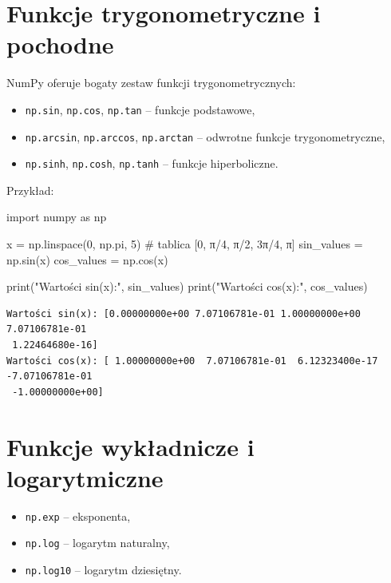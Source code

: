 \documentclass[
  polish,
  letterpaper,
  DIV=11,
  numbers=noendperiod]{scrreprt}
\newenvironment{Shaded}{\begin{snugshade}}{\end{snugshade}}
\newcommand{\BuiltInTok}[1]{\textcolor[rgb]{0.00,0.23,0.31}{#1}}
\newcommand{\CommentTok}[1]{\textcolor[rgb]{0.37,0.37,0.37}{#1}}
\newcommand{\DecValTok}[1]{\textcolor[rgb]{0.68,0.00,0.00}{#1}}
\newcommand{\ImportTok}[1]{\textcolor[rgb]{0.00,0.46,0.62}{#1}}
\newcommand{\NormalTok}[1]{\textcolor[rgb]{0.00,0.23,0.31}{#1}}
\newcommand{\OperatorTok}[1]{\textcolor[rgb]{0.37,0.37,0.37}{#1}}
\newcommand{\StringTok}[1]{\textcolor[rgb]{0.13,0.47,0.30}{#1}}
\providecommand{\tightlist}{%
  \setlength{\itemsep}{0pt}\setlength{\parskip}{0pt}}
\begin{document}
\section{Funkcje trygonometryczne i
pochodne}\label{funkcje-trygonometryczne-i-pochodne}

NumPy oferuje bogaty zestaw funkcji trygonometrycznych:

\begin{itemize}
\tightlist
\item
  \texttt{np.sin}, \texttt{np.cos}, \texttt{np.tan} -- funkcje
  podstawowe,
\item
  \texttt{np.arcsin}, \texttt{np.arccos}, \texttt{np.arctan} -- odwrotne
  funkcje trygonometryczne,
\item
  \texttt{np.sinh}, \texttt{np.cosh}, \texttt{np.tanh} -- funkcje
  hiperboliczne.
\end{itemize}

Przykład:

\begin{Shaded}
\begin{Highlighting}[]
\ImportTok{import}\NormalTok{ numpy }\ImportTok{as}\NormalTok{ np}

\NormalTok{x }\OperatorTok{=}\NormalTok{ np.linspace(}\DecValTok{0}\NormalTok{, np.pi, }\DecValTok{5}\NormalTok{) }\CommentTok{\# tablica [0, π/4, π/2, 3π/4, π]}
\NormalTok{sin\_values }\OperatorTok{=}\NormalTok{ np.sin(x)}
\NormalTok{cos\_values }\OperatorTok{=}\NormalTok{ np.cos(x)}

\BuiltInTok{print}\NormalTok{(}\StringTok{"Wartości sin(x):"}\NormalTok{, sin\_values)}
\BuiltInTok{print}\NormalTok{(}\StringTok{"Wartości cos(x):"}\NormalTok{, cos\_values)}
\end{Highlighting}
\end{Shaded}

\begin{verbatim}
Wartości sin(x): [0.00000000e+00 7.07106781e-01 1.00000000e+00 7.07106781e-01
 1.22464680e-16]
Wartości cos(x): [ 1.00000000e+00  7.07106781e-01  6.12323400e-17 -7.07106781e-01
 -1.00000000e+00]
\end{verbatim}

\section{Funkcje wykładnicze i
logarytmiczne}\label{funkcje-wykux142adnicze-i-logarytmiczne}

\begin{itemize}
\tightlist
\item
  \texttt{np.exp} -- eksponenta,
\item
  \texttt{np.log} -- logarytm naturalny,
\item
  \texttt{np.log10} -- logarytm dziesiętny.
\end{itemize}
\end{document}
